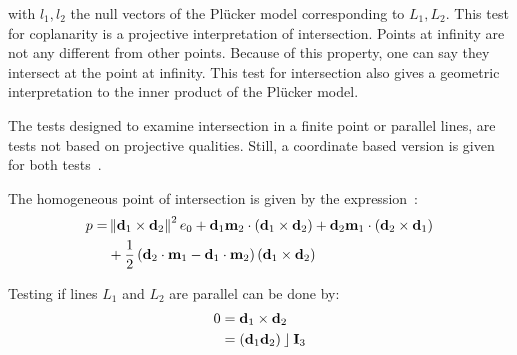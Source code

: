 with $l_1, l_2$ the null vectors of the Pl\"ucker model corresponding to $L_1, L_2$.  This test for coplanarity is a projective interpretation of intersection.  Points at infinity are not any different from other points.  Because of this property, one can say they intersect at the point at infinity.  This test for intersection also gives a geometric interpretation to the inner product of the Pl\"ucker model.

The tests designed to examine intersection in a finite point or parallel lines, are tests not based on projective qualities.  Still, a coordinate based version is given for both tests~\cite{Shoemake}.

The homogeneous point of intersection is given by the expression~\cite[Section 12.1.3]{TheBook}:
\begin{align}
  \label{eq:intersect}
  p =& \left\|\mathbf{d}_1 \times \mathbf{d}_2\right\|^2 e_0 + \mathbf{d}_1 \mathbf{m}_2 \mathbin{\cdot} \left(\mathbf{d}_1 \times \mathbf{d}_2\right) + \mathbf{d}_2 \mathbf{m}_1 \mathbin{\cdot} \left(\mathbf{d}_2 \times \mathbf{d}_1\right) \\
     & + \frac{1}{2} \left(\mathbf{d}_2 \mathbin{\cdot} \mathbf{m}_1 - \mathbf{d}_1 \mathbin{\cdot} \mathbf{m}_2\right) \left(\mathbf{d}_1 \times \mathbf{d}_2\right)
\end{align}

Testing if lines $L_1$ and $L_2$ are parallel can be done by: 
\begin{align*}
  0 &= \mathbf{d}_1 \times \mathbf{d}_2 \\
    &= \left( \mathbf{d}_1 \mathbf{d}_2 \right) \mathbin{\rfloor} \mathbf{I}_3
\end{align*}

